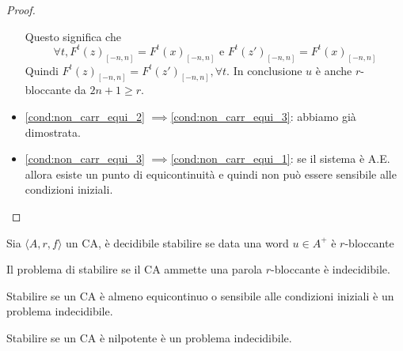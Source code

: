 \begin{teorema}
\begin{proof}
\begin{itemize}
            Questo significa che 
            $$\forall t, F^t(z)_{[-n,n]} = F^t(x)_{[-n,n]}\text{ e } F^t(z')_{[-n,n]} = F^t(x)_{[-n,n]}$$
            Quindi $F^t(z)_{[-n,n]} = F^t(z')_{[-n,n]},\forall t$. In conclusione $u$
            è anche $r$-bloccante da $2n+1\ge r$.
            \item \ref{cond:non_carr_equi_2} $\implies $\ref{cond:non_carr_equi_3}: 
            abbiamo già dimostrata.
            \item \ref{cond:non_carr_equi_3} $\implies $\ref{cond:non_carr_equi_1}: 
            se il sistema è A.E. allora esiste un punto di equicontinuità e quindi
            non può essere sensibile alle condizioni iniziali.
        \end{itemize}
    \end{proof}
\end{teorema}

\begin{teorema}
    Sia $\langle A,r,f\rangle$ un CA, è decidibile stabilire se data una word $u\in A^+$
    è $r$-bloccante
\end{teorema}

\begin{teorema}
    Il problema di stabilire se il CA ammette una parola $r$-bloccante 
    è indecidibile.
\end{teorema}

\begin{teorema}
    Stabilire se un CA è almeno equicontinuo o sensibile alle condizioni iniziali 
    è un problema indecidibile.
\end{teorema}

\begin{teorema}
    Stabilire se un CA è nilpotente è un problema indecidibile.
\end{teorema}

